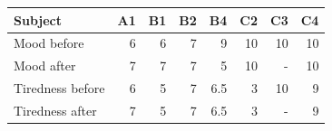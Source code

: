 \begin{tabular}{lrrrrrrr}
	\toprule
	Subject          & A1 & B1 & B2 & B4  & C2 & C3 & C4 \\ \midrule
	Mood before      & 6  & 6  & 7  & 9   & 10 & 10 & 10 \\
	Mood after       & 7  & 7  & 7  & 5   & 10 & -  & 10 \\
	Tiredness before & 6  & 5  & 7  & 6.5 & 3  & 10 & 9  \\
	Tiredness after  & 7  & 5  & 7  & 6.5 & 3  & -  & 9  \\
	\bottomrule
\end{tabular}
